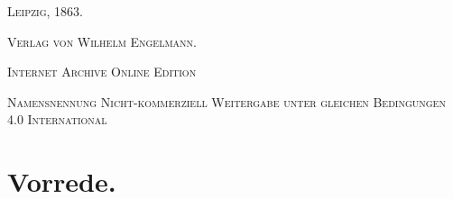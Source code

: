 \documentclass[a4paper, 11pt, oneside]{article}
\begin{document}
\begin{titlepage}
    \vspace*{\fill}

	\vspace{1\baselineskip}

	{\small\scshape Leipzig, 1863.}
	
	{\small\scshape{Verlag von Wilhelm Engelmann.}}
	
	\vspace{0.5\baselineskip} %

    \scshape Internet Archive Online Edition  %
	
	{\scshape\small Namensnennung Nicht-kommerziell Weitergabe unter gleichen Bedingungen 4.0 International} %
\end{titlepage}
\setlength{\parskip}{1mm plus1mm minus1mm}
\clearpage
\tableofcontents
\clearpage
\section*{Vorrede.}
\end{document}
